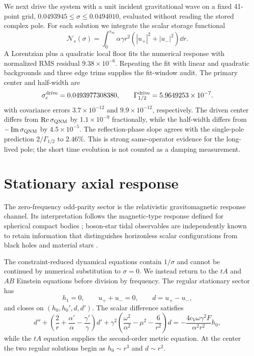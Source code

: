 We next drive the system with a unit incident gravitational wave on a fixed
41-point grid, $0.0493945\leq\sigma\leq0.0494010$, evaluated without reading
the stored complex pole. For each solution we integrate the scalar
storage functional
\begin{equation}
\mathcal N_s(\sigma)=\int_0^{r_m}\alpha\gamma r^2
\left(|u_+|^2+|u_-|^2\right)\dd r.
\label{eq:stored-scalar-norm}
\end{equation}
A Lorentzian plus a quadratic local floor fits the numerical response with
normalized RMS residual $9.38\times10^{-6}$. Repeating the fit with linear and
quadratic backgrounds and three edge trims supplies the fit-window audit. The
primary center and half-width are
\begin{equation}
\sigma_c^{\rm drive}=0.0493977308380,
\qquad
\Gamma_{1/2}^{\rm drive}=5.9649253\times10^{-7}.
\end{equation}
with covariance errors $3.7\times10^{-12}$ and $9.9\times10^{-12}$,
respectively. The driven center differs from
$\operatorname{Re}\sigma_{\rm QNM}$ by $1.1\times10^{-9}$ fractionally, while
the half-width differs from $-\operatorname{Im}\sigma_{\rm QNM}$ by
$4.5\times10^{-5}$. The reflection-phase slope agrees with the single-pole
prediction $2/\Gamma_{1/2}$ to $2.46\%$. This is strong same-operator evidence
for the long-lived pole; the short time evolution is not counted as a damping
measurement.

\section{Stationary axial response}
\label{sec:axial-static}

The zero-frequency odd-parity sector is the relativistic gravitomagnetic
response channel.  Its interpretation follows the magnetic-type response
defined for spherical compact bodies \cite{BinningtonPoisson2009,Pani2018};
boson-star tidal observables are independently known to retain information
that distinguishes horizonless scalar configurations from black holes and
material stars \cite{Sennett2017}.

The constraint-reduced dynamical equations contain $1/\sigma$ and cannot be
continued by numerical substitution to $\sigma=0$.  We instead return to the
$tA$ and $AB$ Einstein equations before division by frequency.  The regular
stationary sector has
\begin{equation}
h_1=0,
\qquad u_++u_-=0,
\qquad d=u_+-u_- ,
\end{equation}
and closes on $(h_0,h_0',d,d')$.  The scalar difference satisfies
\begin{equation}
d''+\left(\frac2r+\frac{\alpha'}\alpha-
\frac{\gamma'}\gamma\right)d'
+\gamma^2\left(\frac{\omega^2}{\alpha^2}-\mu^2-
\frac6{r^2}\right)d
=-\frac{4c_V\omega\gamma^2F}{\alpha^2r^2}h_0,
\label{eq:static-scalar-difference}
\end{equation}
while the $tA$ equation supplies the second-order metric equation.  At the
center the two regular solutions begin as $h_0\sim r^3$ and $d\sim r^2$.

